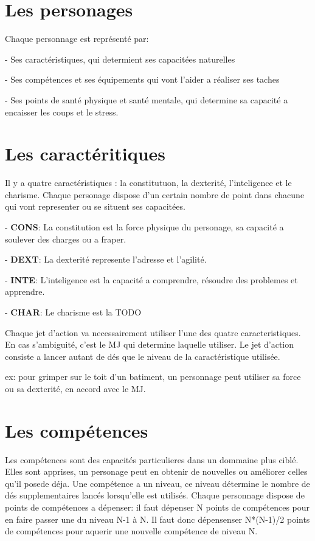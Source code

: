 \documentclass[a4paper,twocolumn]{article}
\begin{document}
\section{Les personages} 

Chaque personnage est représenté par:

- Ses caractéristiques, qui determient ses capacitées naturelles

- Ses compétences et ses équipements qui vont l'aider a réaliser ses taches

- Ses points de santé physique et santé mentale, qui determine sa capacité a encaisser les coups et le stress. 


\section{Les caractéritiques}

Il y a quatre caractéristiques : la constitutuon, la dexterité, l'inteligence et le charisme. Chaque personage dispose d'un certain nombre de point dans chacune qui vont representer ou se situent ses capacitées.

- \textbf{CONS}: La constitution est la force physique du personage, sa capacité a soulever des charges ou a fraper.

- \textbf{DEXT}: La dexterité represente l'adresse et l'agilité.

- \textbf{INTE}: L'inteligence est la capacité a comprendre, résoudre des problemes et apprendre.

- \textbf{CHAR}: Le charisme est la TODO

Chaque jet d'action va necessairement utiliser l'une des quatre caracteristiques. En cas s'ambiguité, c'est le MJ qui determine laquelle utiliser. Le jet d'action consiste a lancer autant de dés que le niveau de la caractéristique utilisée.
	
ex: pour grimper sur le toit d'un batiment, un personnage peut utiliser sa force ou sa dexterité, en accord avec le MJ. 

\section{Les compétences}

Les compétences sont des capacités particulieres dans un dommaine plus ciblé. Elles sont apprises, un personage peut en obtenir de nouvelles ou améliorer celles qu'il posede déja. Une compétence a un niveau, ce niveau détermine le nombre de dés supplementaires lancés lorsqu'elle est utilisés.
Chaque personnage dispose de points de compétences a dépenser: il faut dépenser N points de compétences pour en faire passer une du niveau N-1 à N. Il faut donc dépensenser N*(N-1)/2 points de compétences pour aquerir une nouvelle compétence de niveau N.
\end{document}
